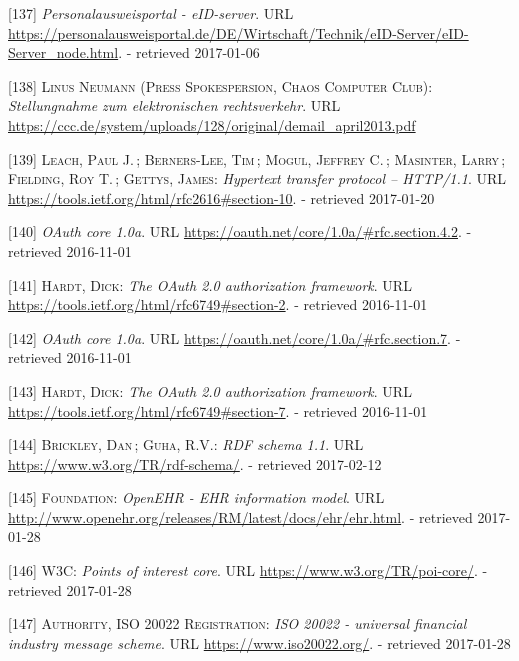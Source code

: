 \documentclass[12pt,english,a4paper,titlepage,cleardoublepage=empty,dottedtoc]{report}
\begin{document}
\hypertarget{ref-web_2017_npa-eid-server}{}
{[}137{]} \emph{Personalausweisportal - eID-server}. URL
\url{https://personalausweisportal.de/DE/Wirtschaft/Technik/eID-Server/eID-Server_node.html}.
- retrieved 2017-01-06

\hypertarget{ref-statement_2013_de-mail}{}
{[}138{]} \textsc{Linus Neumann (Press Spokespersion, Chaos Computer
Club)}: \emph{Stellungnahme zum elektronischen rechtsverkehr}. URL
\url{https://ccc.de/system/uploads/128/original/demail_april2013.pdf}

\hypertarget{ref-web_spec_http-error-codes}{}
{[}139{]} \textsc{Leach, Paul J.}\,; \textsc{Berners-Lee, Tim}\,;
\textsc{Mogul, Jeffrey C.}\,; \textsc{Masinter, Larry}\,;
\textsc{Fielding, Roy T.}\,; \textsc{Gettys, James}: \emph{Hypertext
transfer protocol -- HTTP/1.1}. URL
\url{https://tools.ietf.org/html/rfc2616\#section-10}. - retrieved
2017-01-20

\hypertarget{ref-web_spec_oauth-1a_client-reg}{}
{[}140{]} \emph{OAuth core 1.0a}. URL
\url{https://oauth.net/core/1.0a/\#rfc.section.4.2}. - retrieved
2016-11-01

\hypertarget{ref-web_spec_oauth-2_client-reg}{}
{[}141{]} \textsc{Hardt, Dick}: \emph{The OAuth 2.0 authorization
framework}. URL \url{https://tools.ietf.org/html/rfc6749\#section-2}. -
retrieved 2016-11-01

\hypertarget{ref-web_spec_oauth-1a_access-verification}{}
{[}142{]} \emph{OAuth core 1.0a}. URL
\url{https://oauth.net/core/1.0a/\#rfc.section.7}. - retrieved
2016-11-01

\hypertarget{ref-web_spec_oauth-2_access-verification}{}
{[}143{]} \textsc{Hardt, Dick}: \emph{The OAuth 2.0 authorization
framework}. URL \url{https://tools.ietf.org/html/rfc6749\#section-7}. -
retrieved 2016-11-01

\hypertarget{ref-web_w3c-tr_rdf-schemas}{}
{[}144{]} \textsc{Brickley, Dan}\,; \textsc{Guha, R.V.}: \emph{RDF
schema 1.1}. URL \url{https://www.w3.org/TR/rdf-schema/}. - retrieved
2017-02-12

\hypertarget{ref-web_spec_data-schemas_ehr}{}
{[}145{]} \textsc{Foundation}: \emph{OpenEHR - EHR information model}.
URL \url{http://www.openehr.org/releases/RM/latest/docs/ehr/ehr.html}. -
retrieved 2017-01-28

\hypertarget{ref-web_spec_data-schemas_poi}{}
{[}146{]} \textsc{W3C}: \emph{Points of interest core}. URL
\url{https://www.w3.org/TR/poi-core/}. - retrieved 2017-01-28

\hypertarget{ref-web_spec_data-schemas_bank-transfer}{}
{[}147{]} \textsc{Authority, ISO 20022 Registration}: \emph{ISO 20022 -
universal financial industry message scheme}. URL
\url{https://www.iso20022.org/}. - retrieved 2017-01-28
\end{document}
